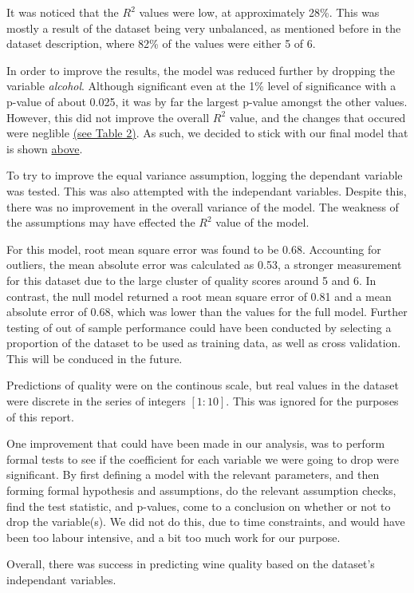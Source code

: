 \documentclass[a4paper,9pt,twocolumn,twoside,]{pinp}
\begin{document}
It was noticed that the \(R^2\) values were low, at approximately 28\%.
This was mostly a result of the dataset being very unbalanced, as
mentioned before in the dataset description, where 82\% of the values
were either 5 of 6.

In order to improve the results, the model was reduced further by
dropping the variable \emph{alcohol}. Although significant even at the
1\% level of significance with a p-value of about 0.025, it was by far
the largest p-value amongst the other values. However, this did not
improve the overall \(R^2\) value, and the changes that occured were
neglible \hyperref[table-2]{(see Table 2)}. As such, we decided to stick
with our final model that is shown \hyperref[eqn:model]{above}.

To try to improve the equal variance assumption, logging the dependant
variable was tested. This was also attempted with the independant
variables. Despite this, there was no improvement in the overall
variance of the model. The weakness of the assumptions may have effected
the \(R^2\) value of the model.

For this model, root mean square error was found to be 0.68. Accounting
for outliers, the mean absolute error was calculated as 0.53, a stronger
measurement for this dataset due to the large cluster of quality scores
around 5 and 6. In contrast, the null model returned a root mean square
error of 0.81 and a mean absolute error of 0.68, which was lower than
the values for the full model. Further testing of out of sample
performance could have been conducted by selecting a proportion of the
dataset to be used as training data, as well as cross validation. This
will be conduced in the future.

Predictions of quality were on the continous scale, but real values in
the dataset were discrete in the series of integers \([1:10]\). This was
ignored for the purposes of this report.

One improvement that could have been made in our analysis, was to
perform formal tests to see if the coefficient for each variable we were
going to drop were significant. By first defining a model with the
relevant parameters, and then forming formal hypothesis and assumptions,
do the relevant assumption checks, find the test statistic, and
p-values, come to a conclusion on whether or not to drop the
variable(s). We did not do this, due to time constraints, and would have
been too labour intensive, and a bit too much work for our purpose.

Overall, there was success in predicting wine quality based on the
dataset's independant variables.
\end{document}
